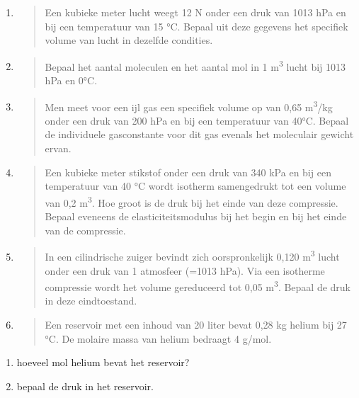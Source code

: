 \documentclass[]{article}
\begin{document}
\begin{enumerate}
\def\labelenumi{\arabic{enumi}.}
\item
  \begin{quote}
  Een kubieke meter lucht weegt 12 N onder een druk van 1013 hPa en bij
  een temperatuur van 15 °C. Bepaal uit deze gegevens het specifiek
  volume van lucht in dezelfde condities.
  \end{quote}
\item
  \begin{quote}
  Bepaal het aantal moleculen en het aantal mol in 1
  m\textsuperscript{3} lucht bij 1013 hPa en 0°C.
  \end{quote}
\item
  \begin{quote}
  Men meet voor een ijl gas een specifiek volume op van 0,65
  m\textsuperscript{3}/kg onder een druk van 200 hPa en bij een
  temperatuur van 40°C. Bepaal de individuele gasconstante voor dit gas
  evenals het moleculair gewicht ervan.
  \end{quote}
\item
  \begin{quote}
  Een kubieke meter stikstof onder een druk van 340 kPa en bij een
  temperatuur van 40 °C wordt isotherm samengedrukt tot een volume van
  0,2 m\textsuperscript{3}. Hoe groot is de druk bij het einde van deze
  compressie. Bepaal eveneens de elasticiteitsmodulus bij het begin en
  bij het einde van de compressie.
  \end{quote}
\item
  \begin{quote}
  In een cilindrische zuiger bevindt zich oorspronkelijk 0,120
  m\textsuperscript{3} lucht onder een druk van 1 atmosfeer (=1013 hPa).
  Via een isotherme compressie wordt het volume gereduceerd tot 0,05
  m\textsuperscript{3}. Bepaal de druk in deze eindtoestand.
  \end{quote}
\item
  \begin{quote}
  Een reservoir met een inhoud van 20 liter bevat 0,28 kg helium bij 27
  °C. De molaire massa van helium bedraagt 4 g/mol.
  \end{quote}
\end{enumerate}

\begin{enumerate}
\def\labelenumi{\alph{enumi}.}
\item
  hoeveel mol helium bevat het reservoir?
\item
  bepaal de druk in het reservoir.
\end{enumerate}
\end{document}
